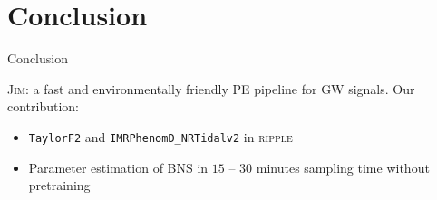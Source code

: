 \documentclass[usenames,dvipsnames,t]{beamer}
\begin{document}
\section{Conclusion}

\begin{frame}{Conclusion}

  \def\x{5mm}
  \def\y{3mm}
  \def\z{3mm}

  \textsc{Jim}: a fast and environmentally friendly PE pipeline for GW signals. Our contribution:
  
  \vspace{\y}

  \begin{itemize}
    
    

    \item \texttt{TaylorF2} and \texttt{IMRPhenomD\_NRTidalv2} in \textsc{ripple}
    
    \vspace{\x}

    \item Parameter estimation of BNS in $15$ -- $30$ minutes sampling time without pretraining




    

\end{itemize}
\end{frame}
\end{document}
